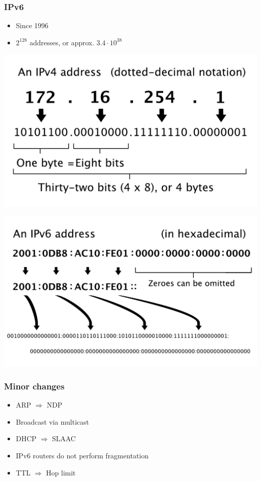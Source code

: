 \documentclass[12pt,leqno,fleqn]{beamer}
\begin{document}
\begin{frame}
\frametitle{IPv6}
\begin{itemize}
\item Since 1996
\item $2^{128}$ addresses, or approx. $3.4 \cdot 10^{38}$
\end{itemize}

\includegraphics[keepaspectratio=true, height=0.35\textheight]{Ipv4_address.pdf}

\includegraphics[keepaspectratio=true, height=0.35\textheight]{Ipv6_address.pdf}
\end{frame}


\begin{frame}
\frametitle{Minor changes}
\begin{itemize}
\item ARP {\large $\Rightarrow$} NDP
\item Broadcast via multicast
\item DHCP {\large $\Rightarrow$} SLAAC
\item IPv6 routers do not perform fragmentation
\item TTL {\large $\Rightarrow$} Hop limit
\end{itemize}
\end{frame}
\end{document}

